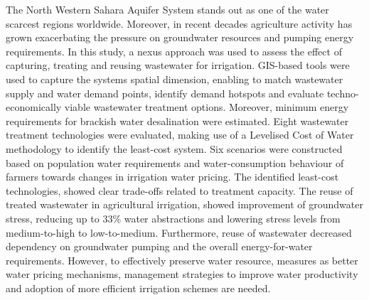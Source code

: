 The North Western Sahara Aquifer System stands out as one of the water scarcest regions worldwide. Moreover, in recent decades agriculture activity has grown exacerbating the pressure on groundwater resources and pumping energy requirements. In this study, a nexus approach was used to assess the effect of capturing, treating and reusing wastewater for irrigation. GIS-based tools were used to capture the systems spatial dimension, enabling to match wastewater supply and water demand points, identify demand hotspots and evaluate techno-economically viable wastewater treatment options. Moreover, minimum energy requirements for brackish water desalination were estimated. Eight  wastewater treatment technologies were evaluated, making use of a Levelised Cost of Water methodology to identify the least-cost system. Six scenarios were constructed based on population water requirements and water-consumption behaviour of farmers towards changes in irrigation water pricing. The identified least-cost technologies, showed clear trade-offs related to treatment capacity. The reuse of treated wastewater in agricultural irrigation, showed improvement of groundwater stress, reducing up to 33\% water abstractions and lowering stress levels from medium-to-high to low-to-medium. Furthermore, reuse of wastewater decreased dependency on groundwater pumping and the overall energy-for-water requirements. However, to effectively preserve water resource, measures as better water pricing mechanisms, management strategies to improve water productivity and adoption of more efficient irrigation schemes are needed.